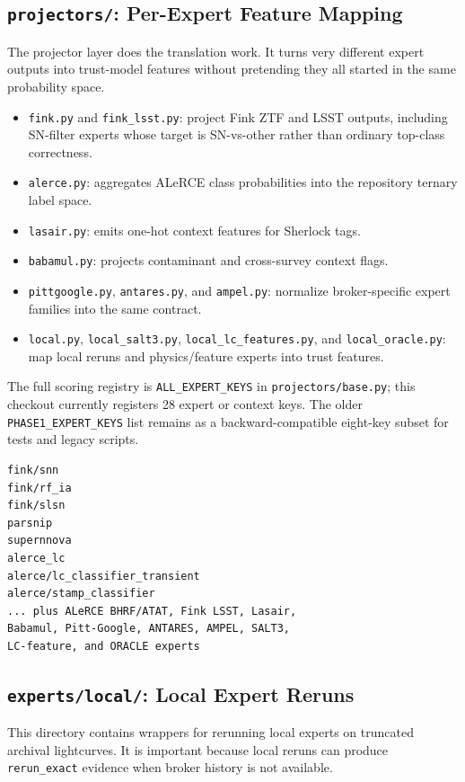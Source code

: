\documentclass[11pt]{article}
\newcommand{\code}[1]{\texttt{#1}}
\begin{document}
\subsection{\code{projectors/}: Per-Expert Feature Mapping}

The projector layer does the translation work. It turns very different expert outputs into trust-model features without pretending they all started in the same probability space.

\begin{itemize}
\item \code{fink.py} and \code{fink\_lsst.py}: project Fink ZTF and LSST outputs, including SN-filter experts whose target is SN-vs-other rather than ordinary top-class correctness.
\item \code{alerce.py}: aggregates ALeRCE class probabilities into the repository ternary label space.
\item \code{lasair.py}: emits one-hot context features for Sherlock tags.
\item \code{babamul.py}: projects contaminant and cross-survey context flags.
\item \code{pittgoogle.py}, \code{antares.py}, and \code{ampel.py}: normalize broker-specific expert families into the same contract.
\item \code{local.py}, \code{local\_salt3.py}, \code{local\_lc\_features.py}, and \code{local\_oracle.py}: map local reruns and physics/feature experts into trust features.
\end{itemize}

The full scoring registry is \code{ALL\_EXPERT\_KEYS} in \code{projectors/base.py}; this checkout currently registers 28 expert or context keys. The older \code{PHASE1\_EXPERT\_KEYS} list remains as a backward-compatible eight-key subset for tests and legacy scripts.

\begin{verbatim}
fink/snn
fink/rf_ia
fink/slsn
parsnip
supernnova
alerce_lc
alerce/lc_classifier_transient
alerce/stamp_classifier
... plus ALeRCE BHRF/ATAT, Fink LSST, Lasair,
Babamul, Pitt-Google, ANTARES, AMPEL, SALT3,
LC-feature, and ORACLE experts
\end{verbatim}

\subsection{\code{experts/local/}: Local Expert Reruns}

This directory contains wrappers for rerunning local experts on truncated archival lightcurves. It is important because local reruns can produce \code{rerun\_exact} evidence when broker history is not available.
\end{document}

